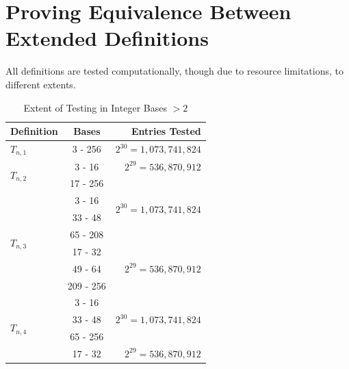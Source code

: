 \documentclass[conference]{IEEEtran}
\begin{document}
\section{Proving Equivalence Between Extended Definitions}

All definitions are tested computationally, though due to resource limitations, to different extents.

\renewcommand{\arraystretch}{1.25}
\begin{table}[H]
\label{tab:testing_bn}
\caption{Extent of Testing in Integer Bases $> 2$}
\centering
\begin{tabular}{|l|c|r|}
\hline
\textbf{Definition}       & \textbf{Bases}         & \textbf{Entries Tested}            \\\hline
$T_{n,1}$                 & 3 - 256                & $2^{30} = 1,073,741,824$           \\\hline
\multirow{2}{*}{$T_{n,2}$}& 3 - 16                 & $2^{29} = 536,870,912$             \\\cline{2-3}
                          & 17 - 256               &\multirow{4}{*}{$2^{30}=1,073,741,824$}\\\cline{1-2}
\multirow{6}{*}{$T_{n,3}$}& 3 - 16                 &                                    \\\cline{2-2} 
                          & 33 - 48                &                                    \\\cline{2-2} 
                          & 65 - 208               &                                    \\\cline{2-3} 
                          & 17 - 32                &\multirow{3}{*}{$2^{29}=536,870,912$}\\\cline{2-2}
                          & 49 - 64                &                                    \\\cline{2-2}
                          & 209 - 256              &                                    \\\hline
\multirow{5}{*}{$T_{n,4}$}& 3 - 16                 &\multirow{3}{*}{$2^{30}=1,073,741,824$}\\\cline{2-2}
                          & 33 - 48                &                                    \\\cline{2-2}
                          & 65 - 256               &                                    \\\cline{2-3}
                          & 17 - 32                &\multirow{4}{*}{$2^{29}=536,870,912$}\\\cline{2-2} 

\end{tabular}
\end{table}
\end{document}
